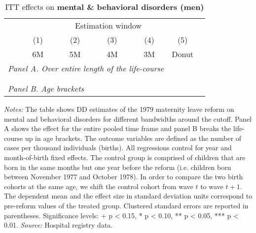  \vspace*{\fill}
 \begin{table}[H] \centering 
 	\begin{threeparttable} \centering \caption{ITT effects on \textbf{mental \& behavioral disorders (men)}}\label{tab: DD_d5_male} {\def\sym#1{\ifmmode^{#1}\else\(^{#1}\)\fi} 
 			\begin{tabular}{l*{6}{c}}
 				\toprule 
 				& \multicolumn{5}{c}{Estimation window} \\ 
 				\cmidrule(lr){2-6}
 				&\multicolumn{1}{c}{(1)}&\multicolumn{1}{c}{(2)}&\multicolumn{1}{c}{(3)}&\multicolumn{1}{c}{(4)}&\multicolumn{1}{c}{(5)}\\
 				&\multicolumn{1}{c}{6M}&\multicolumn{1}{c}{5M}&\multicolumn{1}{c}{4M}&\multicolumn{1}{c}{3M}&\multicolumn{1}{c}{Donut}\\
 				\midrule
 				\multicolumn{5}{l}{\emph{Panel A. Over entire length of the life-course}} \\
 				 \\ \\
 				\multicolumn{5}{l}{\emph{Panel B. Age brackets}} \\
 				    
 				\bottomrule 
 		\end{tabular}}
 		\begin{tablenotes} 
 				\item \scriptsize \emph{Notes:} The table shows DD estimates of the 1979 maternity leave reform on mental and behavioral disorders for different bandwidths around the cutoff. Panel A shows the effect for the entire pooled time frame and panel B breaks the life-course up in age brackets. The outcome variables are defined as the number of cases per thousand individuals (births). All regressions control for year and month-of-birth fixed effects. The control group is comprised of children that are born in the same months but one year before the reform (i.e. children born between November 1977 and October 1978). In order to compare the two birth cohorts at the same age, we shift the control cohort from wave $t$ to wave $t+1$. The dependent mean and the effect size in standard deviation units correspond to pre-reform values of the treated group. Clustered standard errors are reported in parentheses. \newline Significance levels: + p < 0.15, * p < 0.10, ** p < 0.05, *** p < 0.01. \newline 	\emph{Source:} Hospital registry data.
 		\end{tablenotes} 
 	\end{threeparttable} 
 \end{table} 
\vspace*{\fill}\clearpage 